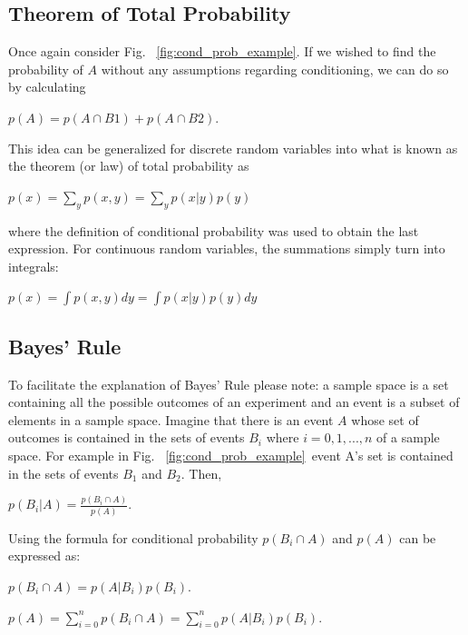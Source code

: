 \documentclass[twoside]{article}
\begin{document}
\subsection{Theorem of Total Probability}

Once again consider Fig. ~\ref{fig:cond_prob_example}. If we wished to find the probability of $A$ without any assumptions regarding conditioning, we can do so by calculating

\begin{center}
$p(A)=p(A \cap B1) + p(A \cap B2).$
\end{center}

This idea can be generalized for discrete random variables into what is known as the theorem (or law) of total probability as

\begin{center}
$p(x)=\sum\limits_{y}p(x,y)=\sum\limits_{y}p(x|y)p(y)$
\end{center}

where the definition of conditional probability was used to obtain the last expression. For continuous random variables, the summations simply turn into integrals:

\begin{center}
$p(x)=\int p(x,y)dy=\int p(x|y)p(y)dy$
\end{center}

\subsection{Bayes' Rule}

To facilitate the explanation of Bayes' Rule please note: a sample space is a set containing all the possible outcomes of an experiment and an event is a subset of elements in a sample space. Imagine that there is an event $A$ whose set of outcomes is contained in the sets of events $B_i$ where $i = 0, 1, ..., n$ of a sample space. For example in Fig. ~\ref{fig:cond_prob_example}\ event A's set is contained in the sets of events $B_1$ and $B_2$. Then,

\begin{center}
$p(B_i|A)=\frac{p(B_i \cap A)}{p(A)}$.
\end{center}

Using the formula for conditional probability $p(B_i \cap A)$ and $p(A)$ can be expressed as:

\begin{center}
$p(B_i \cap A)= p(A|B_i)p(B_i) $.

$p(A)= \sum\limits_{i = 0}^{n} p(B_i \cap A) = \sum\limits_{i = 0}^{n} p(A|B_i)p(B_i)$.
\end{center}
\end{document}
